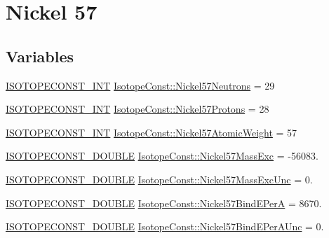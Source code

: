 \hypertarget{group___isotope_const-_nickel-_ni57}{}\section{Nickel 57}
\label{group___isotope_const-_nickel-_ni57}
\subsection*{Variables}
\begin{DoxyCompactItemize}
\item 
\mbox{\hyperlink{group___isotope_const-_macros_ga5f18360b3e99483a35c32d789e62621c}{I\+S\+O\+T\+O\+P\+E\+C\+O\+N\+S\+T\+\_\+\+I\+NT}} \mbox{\hyperlink{group___isotope_const-_nickel-_ni57_ga7d5836e0cffe3bade9d12c894a850736}{Isotope\+Const\+::\+Nickel57\+Neutrons}} = 29
\item 
\mbox{\hyperlink{group___isotope_const-_macros_ga5f18360b3e99483a35c32d789e62621c}{I\+S\+O\+T\+O\+P\+E\+C\+O\+N\+S\+T\+\_\+\+I\+NT}} \mbox{\hyperlink{group___isotope_const-_nickel-_ni57_gab4997ad686081fd2b69eddef45b53642}{Isotope\+Const\+::\+Nickel57\+Protons}} = 28
\item 
\mbox{\hyperlink{group___isotope_const-_macros_ga5f18360b3e99483a35c32d789e62621c}{I\+S\+O\+T\+O\+P\+E\+C\+O\+N\+S\+T\+\_\+\+I\+NT}} \mbox{\hyperlink{group___isotope_const-_nickel-_ni57_ga6abec9eaa5638d5463fedd20224179a2}{Isotope\+Const\+::\+Nickel57\+Atomic\+Weight}} = 57
\item 
\mbox{\hyperlink{group___isotope_const-_macros_ga8f45a7272ce02c0b4c65c44636ed719a}{I\+S\+O\+T\+O\+P\+E\+C\+O\+N\+S\+T\+\_\+\+D\+O\+U\+B\+LE}} \mbox{\hyperlink{group___isotope_const-_nickel-_ni57_ga0dab1af68f207e6ac1aa89e34ec4941d}{Isotope\+Const\+::\+Nickel57\+Mass\+Exc}} = -\/56083.
\item 
\mbox{\hyperlink{group___isotope_const-_macros_ga8f45a7272ce02c0b4c65c44636ed719a}{I\+S\+O\+T\+O\+P\+E\+C\+O\+N\+S\+T\+\_\+\+D\+O\+U\+B\+LE}} \mbox{\hyperlink{group___isotope_const-_nickel-_ni57_gadf227e62a16992526ae53032d45f7de4}{Isotope\+Const\+::\+Nickel57\+Mass\+Exc\+Unc}} = 0.
\item 
\mbox{\hyperlink{group___isotope_const-_macros_ga8f45a7272ce02c0b4c65c44636ed719a}{I\+S\+O\+T\+O\+P\+E\+C\+O\+N\+S\+T\+\_\+\+D\+O\+U\+B\+LE}} \mbox{\hyperlink{group___isotope_const-_nickel-_ni57_ga7c719a95cc1475cb2a96cea13564142f}{Isotope\+Const\+::\+Nickel57\+Bind\+E\+PerA}} = 8670.
\item 
\mbox{\hyperlink{group___isotope_const-_macros_ga8f45a7272ce02c0b4c65c44636ed719a}{I\+S\+O\+T\+O\+P\+E\+C\+O\+N\+S\+T\+\_\+\+D\+O\+U\+B\+LE}} \mbox{\hyperlink{group___isotope_const-_nickel-_ni57_gab7f84d5a03b515741e1b9d258fc37b2c}{Isotope\+Const\+::\+Nickel57\+Bind\+E\+Per\+A\+Unc}} = 0.

\end{DoxyCompactItemize}
